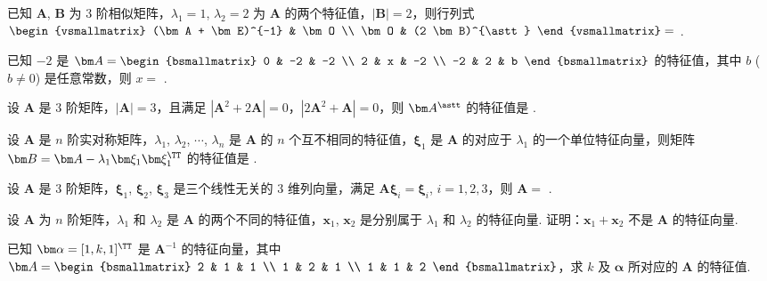 	\begin{titwo}
		已知 $\bm A$, $\bm B$ 为 $3$ 阶相似矩阵，$\lambda_{1} = 1$, $\lambda_{2} = 2$ 为 $\bm A$ 的两个特征值，$|\bm B| = 2$，则行列式 $\begin{vsmallmatrix}
			(\bm A + \bm E)^{-1} & \bm O \\
			\bm O & (2 \bm B)^{\astt}
		\end{vsmallmatrix} = $ \htwo.
	\end{titwo}

	\begin{titwo}
		已知 $-2$ 是 $\bm A = \begin{bsmallmatrix}
			0 & -2 & -2 \\
			2 & x & -2 \\
			-2 & 2 & b
		\end{bsmallmatrix}$ 的特征值，其中 $b$ ($b \ne 0$) 是任意常数，则 $x = $ \htwo.
	\end{titwo}

	\begin{titwo}
		设 $\bm A$ 是 $3$ 阶矩阵，$|\bm A| = 3$，且满足 $|\bm A^{2} + 2 \bm A| = 0$，$|2 \bm A^{2} + \bm A| = 0$，则 $\bm A^{\astt}$ 的特征值是 \htwo.
	\end{titwo}

	\begin{titwo}
		设 $\bm A$ 是 $n$ 阶实对称矩阵，$\lambda_{1}$, $\lambda_{2}$, $\cdots$, $\lambda_{n}$ 是 $\bm A$ 的 $n$ 个互不相同的特征值，$\bm \xi_{1}$ 是 $\bm A$ 的对应于 $\lambda_{1}$ 的一个单位特征向量，则矩阵 $\bm B = \bm A - \lambda_{1} \bm \xi_{1} \bm \xi_{1}^{\TT}$ 的特征值是 \htwo.
	\end{titwo}

	\begin{titwo}
		设 $\bm A$ 是 $3$ 阶矩阵，$\bm \xi_{1}$, $\bm \xi_{2}$, $\bm \xi_{3}$ 是三个线性无关的 $3$ 维列向量，满足 $\bm A \bm \xi_{i} = \bm \xi_{i}$, $i = 1,2,3$，则 $\bm A = $ \htwo.
	\end{titwo}

	\begin{titwo}
		设 $\bm A$ 为 $n$ 阶矩阵，$\lambda_{1}$ 和 $\lambda_{2}$ 是 $\bm A$ 的两个不同的特征值，$\bm x_{1}$, $\bm x_{2}$ 是分别属于 $\lambda_{1}$ 和 $\lambda_{2}$ 的特征向量. 证明：$\bm x_{1} + \bm x_{2}$ 不是 $\bm A$ 的特征向量.
	\end{titwo}

	\begin{titwo}
		已知 $\bm \alpha = [1,k,1]^{\TT}$ 是 $\bm A^{-1}$ 的特征向量，其中 $\bm A = \begin{bsmallmatrix}
			2 & 1 & 1 \\
			1 & 2 & 1 \\
			1 & 1 & 2
		\end{bsmallmatrix}$，求 $k$ 及 $\bm \alpha$ 所对应的 $\bm A$ 的特征值.
	\end{titwo}

